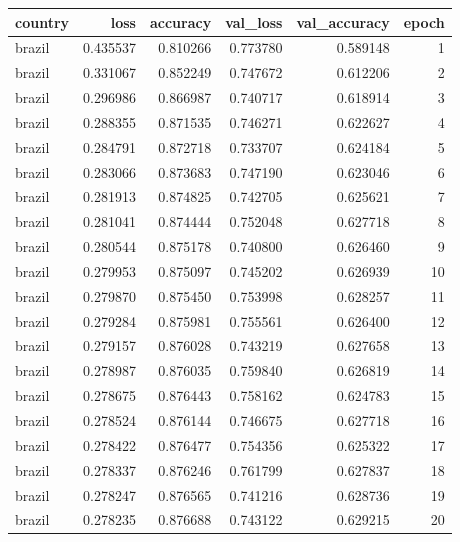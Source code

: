 \begin{tabular}{lrrrrr}
\toprule
country & loss & accuracy & val_loss & val_accuracy & epoch \\
\midrule
brazil & 0.435537 & 0.810266 & 0.773780 & 0.589148 & 1 \\
brazil & 0.331067 & 0.852249 & 0.747672 & 0.612206 & 2 \\
brazil & 0.296986 & 0.866987 & 0.740717 & 0.618914 & 3 \\
brazil & 0.288355 & 0.871535 & 0.746271 & 0.622627 & 4 \\
brazil & 0.284791 & 0.872718 & 0.733707 & 0.624184 & 5 \\
brazil & 0.283066 & 0.873683 & 0.747190 & 0.623046 & 6 \\
brazil & 0.281913 & 0.874825 & 0.742705 & 0.625621 & 7 \\
brazil & 0.281041 & 0.874444 & 0.752048 & 0.627718 & 8 \\
brazil & 0.280544 & 0.875178 & 0.740800 & 0.626460 & 9 \\
brazil & 0.279953 & 0.875097 & 0.745202 & 0.626939 & 10 \\
brazil & 0.279870 & 0.875450 & 0.753998 & 0.628257 & 11 \\
brazil & 0.279284 & 0.875981 & 0.755561 & 0.626400 & 12 \\
brazil & 0.279157 & 0.876028 & 0.743219 & 0.627658 & 13 \\
brazil & 0.278987 & 0.876035 & 0.759840 & 0.626819 & 14 \\
brazil & 0.278675 & 0.876443 & 0.758162 & 0.624783 & 15 \\
brazil & 0.278524 & 0.876144 & 0.746675 & 0.627718 & 16 \\
brazil & 0.278422 & 0.876477 & 0.754356 & 0.625322 & 17 \\
brazil & 0.278337 & 0.876246 & 0.761799 & 0.627837 & 18 \\
brazil & 0.278247 & 0.876565 & 0.741216 & 0.628736 & 19 \\
brazil & 0.278235 & 0.876688 & 0.743122 & 0.629215 & 20 \\
\bottomrule
\end{tabular}
